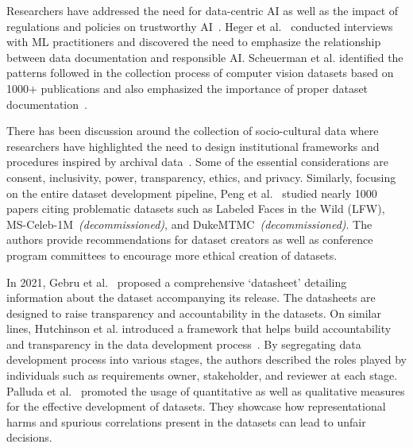 \documentclass[journal]{IEEEtran}
\begin{document}
Researchers have addressed the need for data-centric AI as well as the impact of regulations and policies on trustworthy AI~\cite{liang2022advances}. Heger et al.~\cite{heger2022understanding} conducted interviews with ML practitioners and discovered the need to emphasize the relationship between data documentation and responsible AI. Scheuerman et al. identified the patterns followed in the collection process of computer vision datasets based on 1000$+$ publications and also emphasized the importance of proper dataset documentation~\cite{scheuerman2021datasets}.

There has been discussion around the collection of socio-cultural data where researchers have highlighted the need to design institutional frameworks and procedures inspired by archival data~\cite{jo2020lessons}. Some of the essential considerations are consent, inclusivity, power, transparency, ethics, and privacy. Similarly, focusing on the entire dataset development pipeline, Peng et al.~\cite{peng2021mitigating} studied nearly 1000 papers citing problematic datasets such as Labeled Faces in the Wild (LFW), MS-Celeb-1M~\textit{(decommissioned)}, and DukeMTMC~\textit{(decommissioned)}. The authors provide recommendations for dataset creators as well as conference program committees to encourage more ethical creation of datasets. 

In 2021, Gebru et al.~\cite{gebru2021datasheets} proposed a comprehensive `datasheet' detailing information about the dataset accompanying its release. The datasheets are designed to raise transparency and accountability in the datasets. On similar lines, Hutchinson et al. introduced a framework that helps build accountability and transparency in the data development process~\cite{hutchinson2021towards}. By segregating data development process into various stages, the authors described the roles played by individuals such as requirements owner, stakeholder, and reviewer at each stage. Palluda et al.~\cite{paullada2021data} promoted the usage of quantitative as well as qualitative measures for the effective development of datasets. They showcase how representational harms and spurious correlations present in the datasets can lead to unfair decisions.
\end{document}
